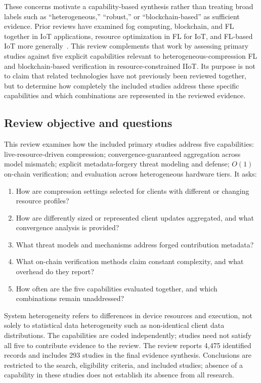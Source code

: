 \documentclass[journal]{IEEEtran}
\begin{document}
These concerns motivate a capability-based synthesis rather than treating broad labels such as “heterogeneous,” “robust,” or “blockchain-based” as sufficient evidence. Prior reviews have examined fog computing, blockchain, and FL together in IoT applications, resource optimization in FL for IoT, and FL-based IoT more generally~\cite{solis2024synergy,ferreira2023resource,hosseinzadeh2022iot}. This review complements that work by assessing primary studies against five explicit capabilities relevant to heterogeneous-compression FL and blockchain-based verification in resource-constrained IIoT. Its purpose is not to claim that related technologies have not previously been reviewed together, but to determine how completely the included studies address these specific capabilities and which combinations are represented in the reviewed evidence.

\subsection{Review objective and questions}

This review examines how the included primary studies address five capabilities: live-resource-driven compression; convergence-guaranteed aggregation across model mismatch; explicit metadata-forgery threat modeling and defense; $O(1)$ on-chain verification; and evaluation across heterogeneous hardware tiers. It asks:
\begin{enumerate}
  \item How are compression settings selected for clients with different or changing resource profiles?
  \item How are differently sized or represented client updates aggregated, and what convergence analysis is provided?
  \item What threat models and mechanisms address forged contribution metadata?
  \item What on-chain verification methods claim constant complexity, and what overhead do they report?
  \item How often are the five capabilities evaluated together, and which combinations remain unaddressed?
\end{enumerate}
System heterogeneity refers to differences in device resources and execution, not solely to statistical data heterogeneity such as non-identical client data distributions. The capabilities are coded independently; studies need not satisfy all five to contribute evidence to the review. The review reports 4,475 identified records and includes 293 studies in the final evidence synthesis. Conclusions are restricted to the search, eligibility criteria, and included studies; absence of a capability in these studies does not establish its absence from all research.
\end{document}
